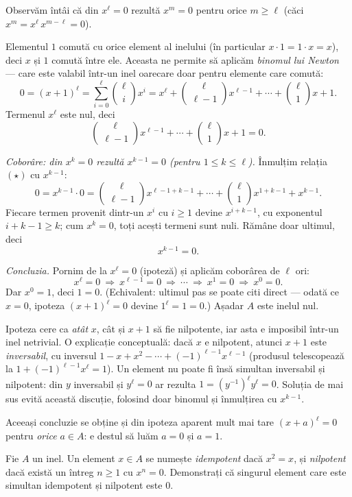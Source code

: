 \begin{solutie}
Observăm întâi că din $x^{\ell}=0$ rezultă $x^{m}=0$
pentru orice $m\ge\ell$ (căci $x^{m}=x^{\ell}\,x^{m-\ell}=0$).

Elementul $1$ comută cu orice element al inelului (în particular
$x\cdot 1=1\cdot x=x$), deci $x$ și $1$ comută între ele. Aceasta
ne permite să aplicăm \emph{binomul lui Newton} --- care este valabil
într-un inel oarecare doar pentru elemente care comută:
\[
  0=(x+1)^{\ell}=\sum_{i=0}^{\ell}\binom{\ell}{i}x^{i}
   =x^{\ell}+\binom{\ell}{\ell-1}x^{\ell-1}+\cdots+\binom{\ell}{1}x+1 .
\]
Termenul $x^{\ell}$ este nul, deci
\[
  \binom{\ell}{\ell-1}x^{\ell-1}+\cdots+\binom{\ell}{1}x+1=0 . \tag{$\star$}
\]

\smallskip
\textit{Coborâre: din $x^{k}=0$ rezultă $x^{k-1}=0$ (pentru $1\le k\le\ell$).}
Înmulțim relația $(\star)$ cu $x^{k-1}$:
\[
  0=x^{k-1}\cdot 0=\binom{\ell}{\ell-1}x^{\ell-1+k-1}+\cdots+\binom{\ell}{1}x^{1+k-1}+x^{k-1}.
\]
Fiecare termen provenit dintr-un $x^{i}$ cu $i\ge 1$ devine $x^{i+k-1}$, cu
exponentul $i+k-1\ge k$; cum $x^{k}=0$, toți acești termeni sunt nuli.
Rămâne doar ultimul, deci
\[
  x^{k-1}=0 .
\]

\smallskip
\textit{Concluzia.} Pornim de la $x^{\ell}=0$ (ipoteză) și
aplicăm coborârea de $\ell$ ori:
\[
  x^{\ell}=0\ \Longrightarrow\ x^{\ell-1}=0\ \Longrightarrow\ \cdots
  \ \Longrightarrow\ x^{1}=0\ \Longrightarrow\ x^{0}=0 .
\]
Dar $x^{0}=1$, deci $1=0$. (Echivalent: ultimul pas se poate citi direct ---
odată ce $x=0$, ipoteza $(x+1)^{\ell}=0$ devine $1^{\ell}=1=0$.) Așadar
$A$ este inelul nul.
\end{solutie}

\begin{obs}
Ipoteza cere ca \emph{atât} $x$, cât și $x+1$ să fie
nilpotente, iar asta e imposibil într-un inel netrivial. O explicație
conceptuală: dacă $x$ e nilpotent, atunci $x+1$ este \emph{inversabil},
cu inversul $1-x+x^{2}-\cdots+(-1)^{\ell-1}x^{\ell-1}$ (produsul telescopează
la $1+(-1)^{\ell-1}x^{\ell}=1$). Un element nu poate fi însă
simultan inversabil și nilpotent: din $y$ inversabil și $y^{\ell}=0$
ar rezulta $1=(y^{-1})^{\ell}y^{\ell}=0$. Soluția de mai sus evită
această discuție, folosind doar binomul și înmulțirea cu
$x^{k-1}$.

Aceeași concluzie se obține și din ipoteza aparent mult mai tare
$(x+a)^{\ell}=0$ pentru \emph{orice} $a\in A$: e destul să luăm
$a=0$ și $a=1$.
\end{obs}

\begin{problema}
Fie $A$ un inel. Un element $x\in A$ se numește \emph{idempotent}
dacă $x^{2}=x$, și \emph{nilpotent} dacă există un
întreg $n\ge 1$ cu $x^{n}=0$. Demonstrați că singurul element
care este simultan idempotent și nilpotent este $0$.
\end{problema}

